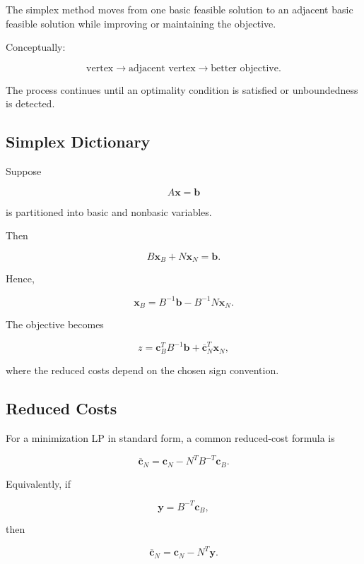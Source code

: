 The simplex method moves from one basic feasible solution to an adjacent
basic feasible solution while improving or maintaining the objective.

Conceptually:

\[
\boxed{
\text{vertex}
\rightarrow
\text{adjacent vertex}
\rightarrow
\text{better objective}.
}
\]

The process continues until an optimality condition is satisfied or
unboundedness is detected.

\subsection{Simplex Dictionary}
\label{subsec:simplex-dictionary}

Suppose

\[
A\mathbf{x}=\mathbf{b}
\]

is partitioned into basic and nonbasic variables.

Then

\[
B\mathbf{x}_B
+
N\mathbf{x}_N
=
\mathbf{b}.
\]

Hence,

\[
\boxed{
\mathbf{x}_B
=
B^{-1}\mathbf{b}
-
B^{-1}N\mathbf{x}_N.
}
\]

The objective becomes

\[
\boxed{
z
=
\mathbf{c}_B^TB^{-1}\mathbf{b}
+
\overline{\mathbf{c}}_N^T
\mathbf{x}_N,
}
\]

where the reduced costs depend on the chosen sign convention.

\subsection{Reduced Costs}
\label{subsec:reduced-costs}

For a minimization LP in standard form, a common reduced-cost formula is

\[
\boxed{
\overline{\mathbf{c}}_N
=
\mathbf{c}_N
-
N^TB^{-T}\mathbf{c}_B.
}
\]

Equivalently, if

\[
\boxed{
\mathbf{y}
=
B^{-T}\mathbf{c}_B,
}
\]

then

\[
\boxed{
\overline{\mathbf{c}}_N
=
\mathbf{c}_N
-
N^T\mathbf{y}.
}
\]

